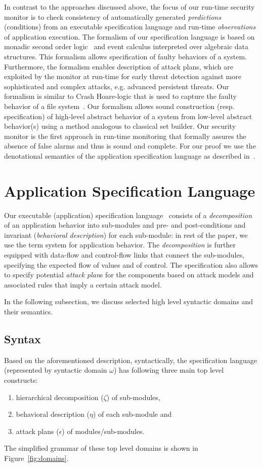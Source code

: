 \documentclass[conference]{IEEEtran}
\begin{document}
In contrast to the approaches discussed above, the focus of our run-time security monitor is to check consistency of automatically generated \emph{predictions} (conditions) from an executable specification language and run-time \emph{observations} of application execution. The formalism of our specification language is based on monadic second order logic~\cite{Henriksen:1995} and event calculus interpreted over algebraic data structures. This formalism allows specification of faulty behaviors of a system. Furthermore, the formalism enables description of attack plans, which are exploited by the monitor at run-time for early threat detection against more sophisticated and complex attacks, e.g. advanced persistent threats. Our formalism is similar to Crash Hoare-logic that is used to capture the faulty behavior of a file system~\cite{Chen:2015}. Our formalism allows sound construction (resp. specification) of high-level abstract behavior of a system from low-level abstract behavior(s) using a method analogous to classical set builder. Our security monitor is the first approach in run-time monitoring that formally assures the absence of false alarms and thus is sound and complete. For our proof we use the denotational semantics of the application specification language as described in~\cite{MTK:2015a}.



\section{Application Specification Language}\label{sec:lang}
Our executable (application) specification language~\cite{Shrobe:2006} consists of a \emph{decomposition} of an application behavior into sub-modules and pre- and post-conditions and invariant (\emph{behavioral description}) for each sub-module: in rest of the paper, we use the term system for application behavior. The \emph{decomposition} is further equipped with data-flow and control-flow links that connect the sub-modules, specifying the expected flow of values and of control. The specification also allows to specify potential \emph{attack plan}s for the components based on attack models and associated rules that imply a certain attack model.

In the following subsection, we discuss selected high level syntactic domains and their semantics. 
\subsection{Syntax}\label{subsec:sam-syntax}
Based on the aforementioned description, syntactically, the specification language (represented by syntactic domain $\omega$) has following three main top level constructs:
\begin{enumerate}
\item hierarchical decomposition ($\zeta$) of sub-modules,
\item behavioral description ($\eta$) of each sub-module and
\item attack plans ($\epsilon$) of modules/sub-modules.
\end{enumerate}
The simplified grammar of these top level domains is shown in Figure~\ref{fig:domains}.
\end{document}
